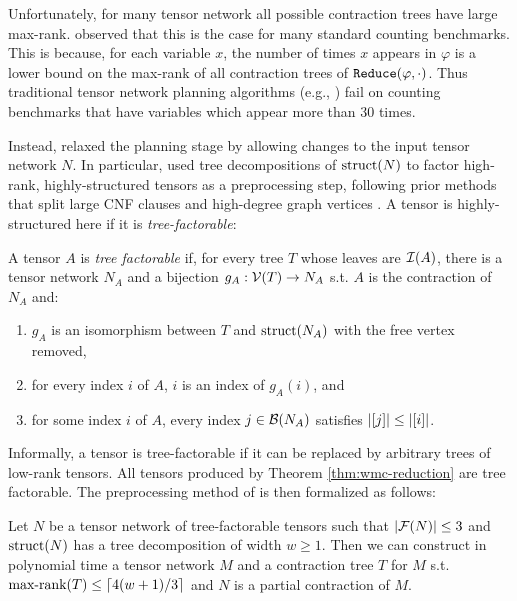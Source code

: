 Unfortunately, for many tensor network all possible contraction trees have large max-rank. \cite{DDV19} observed that this is the case for many standard counting benchmarks. This is because, for each variable $x$, the number of times $x$ appears in $\varphi$ is a lower bound on the max-rank of all contraction trees of $\texttt{\upshape Reduce}(\varphi, \cdot)$. Thus traditional tensor network planning algorithms (e.g., \cite{DFGHSW18,KCMR18,MS08}) fail on counting benchmarks that have variables which appear more than $30$ times. 

Instead, \cite{DDV19} relaxed the planning stage by allowing changes to the input tensor network $N$. In particular, \cite{DDV19} used tree decompositions of $\text{struct}(N)$ to factor high-rank, highly-structured tensors as a preprocessing step, following prior methods that split large CNF clauses \cite{SS10_2} and high-degree graph vertices \cite{oliveira18,MS11}. A tensor is highly-structured here if it is \emph{tree-factorable}:
\begin{definition} \label{def:tree-factorable}
A tensor $A$ is \emph{tree factorable} if, for every tree $T$ whose leaves are $\mathcal{I}(A)$, there is a tensor network $N_A$ and a bijection $g_A: \mathcal{V}(T) \rightarrow N_A$ s.t. $A$ is the contraction of $N_A$ and:
\begin{enumerate}\itemsep0em 
\item $g_A$ is an isomorphism between $T$ and $\text{struct}(N_A)$ with the free vertex removed,
\item for every index $i$ of $A$, $i$ is an index of $g_A(i)$, and
\item for some index $i$ of $A$, every index $j \in \mathcal{B}(N_A)$ satisfies $|[j]| \leq |[i]|$. %
\end{enumerate}
\end{definition}
Informally, a tensor is tree-factorable if it can be replaced by arbitrary trees of low-rank tensors. All tensors produced by Theorem \ref{thm:wmc-reduction} are tree factorable. 
The preprocessing method of \cite{DDV19} is then formalized as follows:
\begin{theorem} \label{thm:factorable-tree}
Let $N$ be a tensor network of tree-factorable tensors such that $|\mathcal{F}(N)| \leq 3$ and $\text{struct}(N)$ has a tree decomposition of width $w \geq 1$. Then we can construct in polynomial time a tensor network $M$ and a contraction tree $T$ for $M$ s.t. $\text{max-rank}(T) \leq \lceil4(w+1)/3\rceil$ and $N$ is a partial contraction of $M$.
\end{theorem}

